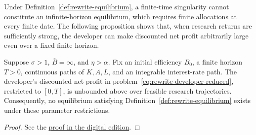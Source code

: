 Under Definition~\ref{def:rewrite-equilibrium}, a finite-time singularity
cannot constitute an infinite-horizon equilibrium, which requires finite
allocations at every finite date. The following
proposition shows that, when research returns are
sufficiently strong, the developer can make discounted net profit arbitrarily
large even over a fixed finite horizon.


\begin{proposition}
\label{prop:rewrite-research-scale}
Suppose $\sigma>1$, $\overline B=\infty$, and $\eta>\alpha$.
Fix an initial efficiency $B_0$, a finite horizon $T>0$, continuous
paths of $K,A,L$, and an integrable interest-rate path.
The developer's discounted net profit in
problem~\eqref{eq:rewrite-developer-reduced}, restricted to $[0,T]$,
is unbounded above over feasible research trajectories. %
Consequently, no equilibrium satisfying
Definition~\ref{def:rewrite-equilibrium} exists under these parameter
restrictions.
\end{proposition}
\begin{proof}
See the \href{https://oliverpardo1979.github.io/ai-growth-and-labor/#proof:rewrite-research-scale}
{proof in the digital edition}.
\end{proof}




